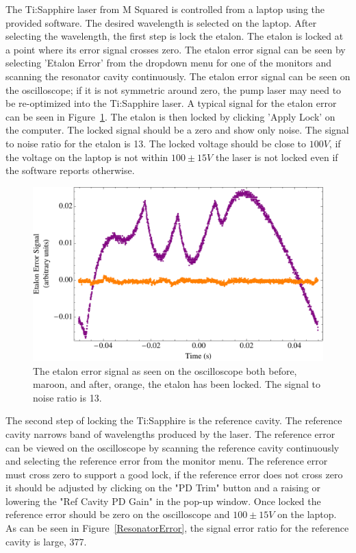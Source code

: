 \documentclass[prb,preprint]{revtex4-1}
\begin{document}
The Ti:Sapphire laser from M Squared is controlled from a laptop using the provided software. The desired wavelength is selected on the laptop. After selecting the wavelength, the first step is lock the etalon. The etalon is locked at a point where its error signal crosses zero. The etalon error signal can be seen by selecting 'Etalon Error' from the dropdown menu for one of the monitors and scanning the resonator cavity continuously. The etalon error signal can be seen on the oscilloscope; if it is not symmetric around zero, the pump laser may need to be re-optimized into the Ti:Sapphire laser. A typical signal for the etalon error can be seen in Figure~\ref{EtalonError}. The etalon is then locked by clicking 'Apply Lock' on the computer. The locked signal should be a zero and show only noise. The signal to noise ratio for the etalon is 13. The locked voltage should be close to $100 V$, if the voltage on the laptop is not within $100 \pm 15 V$ the laser is not locked even if the software reports otherwise.

\begin{figure}[h!]
\centering
\includegraphics[width=6in]{EtalonError.pdf}
\caption{The etalon error signal as seen on the oscilloscope both before, maroon, and after, orange, the etalon has been locked. The signal to noise ratio is 13.}
\label{EtalonError}
\end{figure}

The second step of locking the Ti:Sapphire is the reference cavity. The reference cavity narrows  band of wavelengths produced by the laser. The reference error can be viewed on the oscilloscope by scanning the reference cavity continuously and selecting the reference error from the monitor menu. The reference error must cross zero to support a good lock, if the reference error does not cross zero it should be adjusted by clicking on the "PD Trim" button and a raising or lowering the "Ref Cavity PD Gain" in the pop-up window. Once locked the reference error should be zero on the oscilloscope and $100 \pm 15 V$ on the laptop. As can be seen in Figure~\ref{ResonatorError}, the signal error ratio for the reference cavity is large, 377.
\end{document}
